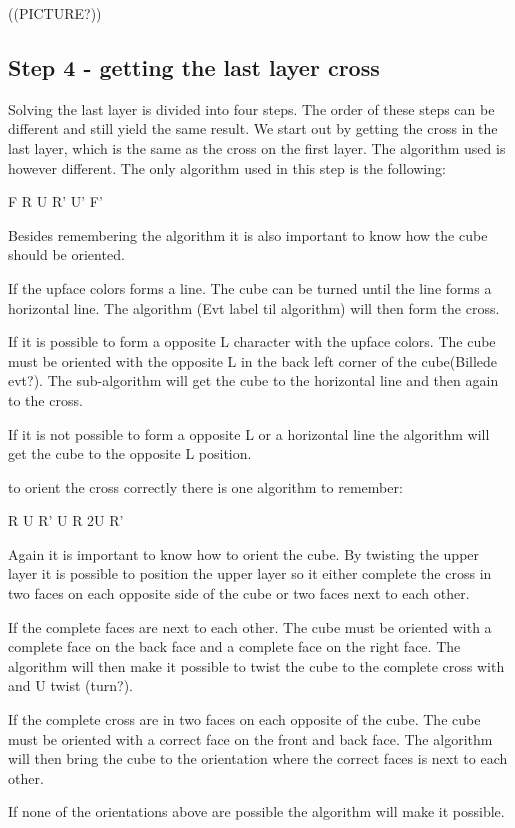 ((PICTURE?))

\subsection{Step 4 - getting the last layer cross}
Solving the last layer is divided into four steps. The order of these steps can be different and still yield the same result. We start out by getting the cross in the last layer, which is the same as the cross on the first layer. The algorithm used is however different. The only algorithm used in this step is the following:

F R U R' U' F'

Besides remembering the algorithm it is also important to know how the cube should be oriented.

If the upface colors forms a line. The cube can be turned until the line forms a horizontal line. The algorithm (Evt label til algorithm) will then form the cross.

If it is possible to form a opposite L character with the upface colors. The cube must be oriented with the opposite L in the back left corner of the cube(Billede evt?). The sub-algorithm will get the cube to the horizontal line and then again to the cross.

If it is not possible to form a opposite L or a horizontal line the algorithm will get the cube to the opposite L position.

to orient the cross correctly there is one algorithm to remember:

R U R' U R 2U R' 

Again it is important to know how to orient the cube. By twisting the upper layer it is possible to position the upper layer so it either complete the cross in two faces on each opposite side of the cube or two faces next to each other.

If the complete faces are next to each other. The cube must be oriented with a complete face on the back face and a complete face on the right face. The algorithm will then make it possible to twist the cube to the complete cross with and U twist (turn?).

If the complete cross are in two faces on each opposite of the cube. The cube must be oriented with a correct face on the front and back face. The algorithm will then bring the cube to the orientation where the correct faces is next to each other.

If none of the orientations above are possible the algorithm will make it possible.

